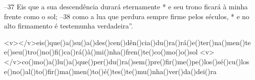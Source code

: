 –37 Eis que a sua descendência durará eternamente *
e seu trono ficará à minha frente como o sol; 
–38 como a lua que perdura sempre firme pelos séculos, *
e no alto firmamento é testemunha verdadeira”.

<v></v>eis()que()a()su()a()des()cen()dên()cia()du()ra()rá()e()ter()na()men()te
e()seu()tro()no()fi()ca()rá()à()mi()nha()fren()te()co()mo()o()sol
<v></v>co()mo()a()lu()a()que()per()du()ra()sem()pre()fir()me()pe()los()sé()cu()los
e()no()al()to()fir()ma()men()to()é()tes()te()mu()nha()ver()da()dei()ra